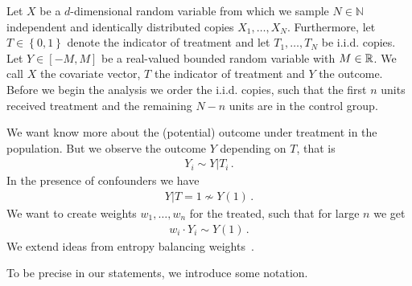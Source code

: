 Let $X$ be a $d$-dimensional random variable from which we sample
$N\in\mathbb{N}$ independent and identically distributed copies
$X_1,\ldots,X_N$. Furthermore, let $T\in \left\{ 0,1 \right\}$ 
denote the indicator of treatment and let $T_1,\ldots,T_N$ be i.i.d. 
copies.
Let $Y\in[-M,M]$ be a real-valued bounded random variable with 
$M\in\mathbb{R}$.
We call $X$ the covariate vector, $T$ the indicator of treatment
and $Y$ the outcome.
Before we begin the analysis we order the i.i.d. copies, such that
the first $n$ units received treatment and the remaining $N-n$ units 
are in the control group.

We want know more about the (potential) outcome under treatment 
in the population.
But we observe the outcome $Y$ depending on $T$,
that is
\begin{gather}
  Y_i \sim Y|T_i
  \,.
\end{gather}
In the presence of confounders we have
\begin{gather}
  Y|T=1 \nsim Y(1)
  \,.
\end{gather}
We want to create weights
$w_1,\ldots,w_n$ for the treated, such that for large $n$ we get
\begin{gather}
  w_i \cdot Y_i \sim Y(1)
  \,.
\end{gather}
We extend ideas from entropy balancing weights~\cite{Wang2019}.

To be precise in our statements, we introduce some notation.
